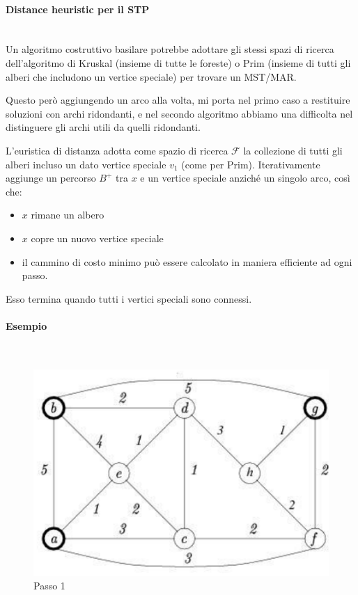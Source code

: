 \documentclass{article}
\begin{document}
    \paragraph{Distance heuristic per il STP}\mbox{}\\
    Un algoritmo costruttivo basilare potrebbe adottare gli stessi spazi di ricerca dell'algoritmo
    di Kruskal (insieme di tutte le foreste) o Prim (insieme di tutti gli alberi
    che includono un vertice speciale) per trovare un MST/MAR.

    Questo però aggiungendo un arco alla volta, mi porta nel primo caso a restituire soluzioni
    con archi ridondanti, e nel secondo algoritmo abbiamo una difficolta nel distinguere gli archi
    utili da quelli ridondanti.

    L'euristica di distanza adotta come spazio di ricerca $\mathcal{F}$ la collezione di tutti gli
    alberi incluso un dato vertice speciale $v_1$ (come per Prim). Iterativamente aggiunge un percorso
$B^+$ tra $x$ e un vertice speciale anziché un singolo arco, così che:
    \begin{itemize}
        \item $x$ rimane un albero
        \item $x$ copre un nuovo vertice speciale
        \item il cammino di costo minimo può essere calcolato in maniera efficiente ad ogni passo.
    \end{itemize}
    Esso termina quando tutti i vertici speciali sono connessi.

    \paragraph{Esempio}\mbox{}\\
    \begin{figure}[H]
        \centering
        \includegraphics[scale=0.5 ]{images/examp0.png}
        \caption{Passo 1}
        \label{fig:exam_0_d}
    \end{figure}
\end{document}
